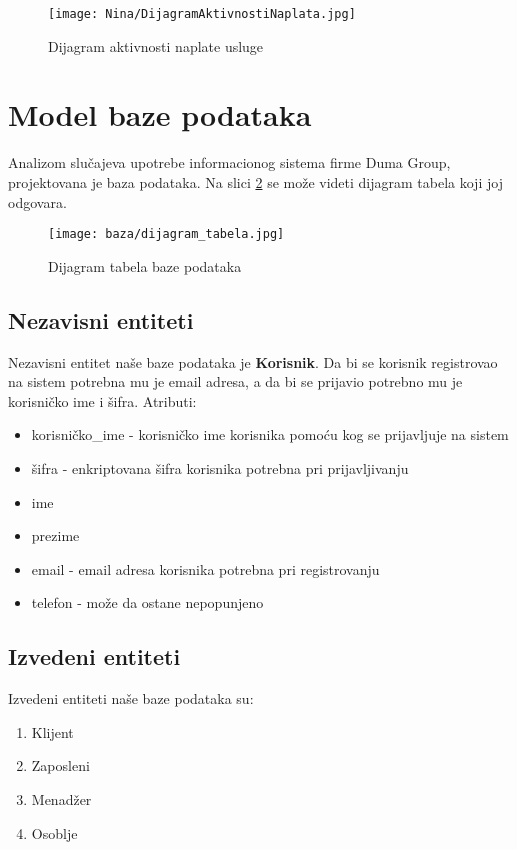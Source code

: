 \documentclass[a4paper]{article}
\begin{document}
\begin{figure}[H]
    \centering
    \texttt{[image: Nina/DijagramAktivnostiNaplata.jpg]}
    \caption{Dijagram aktivnosti naplate usluge}
    \label{fig:RegistracijaZ}
\end{figure}

\section{Model baze podataka}

Analizom slučajeva upotrebe informacionog sistema firme Duma Group, projektovana je baza podataka. Na slici \ref{fig:dijagramTabela}  se može videti dijagram tabela koji joj odgovara.

\begin{figure}[H]
    \centering
    \texttt{[image: baza/dijagram\_tabela.jpg]}
    \caption{Dijagram tabela baze podataka}
    \label{fig:dijagramTabela}
\end{figure}

\subsection{Nezavisni entiteti}

Nezavisni entitet naše baze podataka je \textbf{Korisnik}. Da bi se korisnik registrovao na sistem potrebna mu je email adresa, a da bi se prijavio potrebno mu je korisničko ime i šifra. Atributi:
\begin{itemize}
    \item korisničko\_ime - korisničko ime korisnika pomoću kog se prijavljuje na sistem
    \item šifra - enkriptovana šifra korisnika potrebna pri prijavljivanju
    \item ime
    \item prezime
    \item email - email adresa korisnika potrebna pri registrovanju
    \item telefon - može da ostane nepopunjeno
\end{itemize}


\subsection{Izvedeni entiteti}

Izvedeni entiteti naše baze podataka su:
\begin{enumerate}
    \item Klijent
    \item Zaposleni
    \item Menadžer
    \item Osoblje
\end{enumerate}
\end{document}
